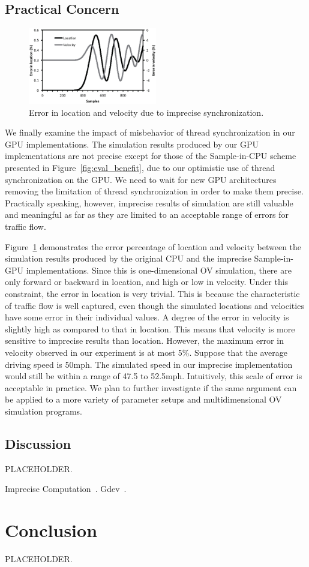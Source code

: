 \documentclass[times, 10pt, twocolumn]{article}
\begin{document}
\subsection{Practical Concern}

\begin{figure}[t]
\centering
\includegraphics[width=0.5\textwidth]{eps/eval_error.eps}
\caption{Error in location and velocity due to imprecise synchronization.}
\label{fig:eval_error}
\end{figure}

We finally examine the impact of misbehavior of thread synchronization
in our GPU implementations.
The simulation results produced by our GPU implementations are not
precise except for those of the Sample-in-CPU scheme presented in
Figure~\ref{fig:eval_benefit}, due to our optimistic use of thread
synchronization on the GPU.
We need to wait for new GPU architectures removing the limitation of
thread synchronization in order to make them precise.
Practically speaking, however, imprecise results of simulation are still
valuable and meaningful as far as they are limited to an acceptable
range of errors for traffic flow.

Figure~\ref{fig:eval_error} demonstrates the error percentage of
location and velocity between the simulation results produced by the
original CPU and the imprecise Sample-in-GPU implementations.
Since this is one-dimensional OV simulation, there are only forward or
backward in location, and high or low in velocity.
Under this constraint, the error in location is very trivial.
This is because the characteristic of traffic flow is well captured,
even though the simulated locations and velocities have some error in
their individual values.
A degree of the error in velocity is slightly high as compared to that
in location.
This means that velocity is more sensitive to imprecise results than
location.
However, the maximum error in velocity observed in our experiment is at
most 5\%.
Suppose that the average driving speed is 50mph.
The simulated speed in our imprecise implementation would still be
within a range of 47.5 to 52.5mph.
Intuitively, this scale of error is acceptable in practice.
We plan to further investigate if the same argument can be applied to a
more variety of parameter setups and multidimensional OV simulation
programs.

\subsection{Discussion}
\label{sec:discussion}

PLACEHOLDER.

Imprecise Computation~\cite{Lin1987}.
Gdev~\cite{Kato2012}.

\section{Conclusion}
\label{sec:conclusion}

PLACEHOLDER.


{\footnotesize

}
\end{document}
